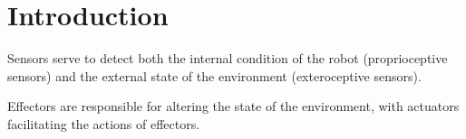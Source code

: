 \section{Introduction}

Sensors serve to detect both the internal condition of the robot (proprioceptive sensors) and the external state of the environment (exteroceptive sensors).

Effectors are responsible for altering the state of the environment, with actuators facilitating the actions of effectors.